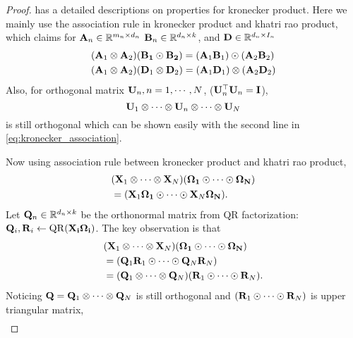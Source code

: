 \begin{proof}
\citep{schacke2013kronecker} has a detailed descriptions on properties for kronecker product. Here we mainly use the association rule in kronecker product and khatri rao product, which claims for $\mathbf{A}_n \in \mathbb{R}^{m_n\times d_n}$ 
$\mathbf{B}_n \in \mathbb{R}^{d_n\times k}$, and $\mathbf{D}\in \mathbb{R}^{d_n\times I_n}$
\begin{equation}
\label{eq:kronecker_association}
\begin{aligned}
& (\mathbf{A}_1\otimes  \mathbf{A}_2)(\mathbf{B_1} \odot  \mathbf{B_2}) = (\mathbf{A}_1\mathbf{B}_1)\odot   (\mathbf{A}_2\mathbf{B}_2)\\
& (\mathbf{A}_1\otimes  \mathbf{A}_2)(\mathbf{D}_1 \otimes  \mathbf{D}_2) = (\mathbf{A}_1\mathbf{D}_1)\otimes  (\mathbf{A}_2\mathbf{D}_2)
\end{aligned}
\end{equation}
Also, for orthogonal matrix $\mathbf{U}_n, n = 1, \cdots, N$, ($\mathbf{U}^\top_n \mathbf{U}_n = \mathbf{I}$),  
\[
\mathbf{U}_1 \otimes \cdots \otimes \mathbf{U}_n \otimes \cdots \otimes \mathbf{U}_N
\]
is still orthogonal which can be shown easily with the second line in \eqref{eq:kronecker_association}. \par 
Now using association rule between kronecker product and khatri rao product,   
\begin{equation}
\begin{aligned}
& (\mathbf{X}_1\otimes \cdots \otimes \mathbf{X}_N)(\mathbf{\Omega_1} \odot \cdots \odot \mathbf{\Omega_N})  \\
& = ( \mathbf{X}_1\mathbf{\Omega_1}\odot \cdots \odot  \mathbf{X}_N\mathbf{\Omega_N}). 
\end{aligned}
\end{equation}
 Let $\mathbf{Q}_n\in \mathbb{R}^{d_n\times k}$ be the orthonormal matrix from QR factorization: $\mathbf{Q}_i, \mathbf{R}_i \gets  \rm{QR}(\mathbf{X_i\Omega_i})$. The key observation is that 
\begin{equation}
\begin{aligned}
& (\mathbf{X}_1\otimes \cdots \otimes \mathbf{X}_N)(\mathbf{\Omega_1} \odot \cdots \odot \mathbf{\Omega_N})  \\
& = ( \mathbf{Q}_1\mathbf{R}_1 \odot \cdots \odot  \mathbf{Q}_N\mathbf{R}_N)\\
& = (\mathbf{Q}_1 \otimes \cdots \otimes \mathbf{Q}_N) (\mathbf{R}_1\odot \cdots \odot \mathbf{R}_N).
\end{aligned}
\end{equation}
Noticing $\mathbf{Q} = \mathbf{Q}_1\otimes \cdots \otimes \mathbf{Q}_N$ is still orthogonal and $(\mathbf{R}_1\odot \cdots \odot \mathbf{R}_N)$ 
is upper triangular matrix,  
\begin{equation}
\begin{aligned}

\end{aligned}
\end{equation}
\end{proof}
